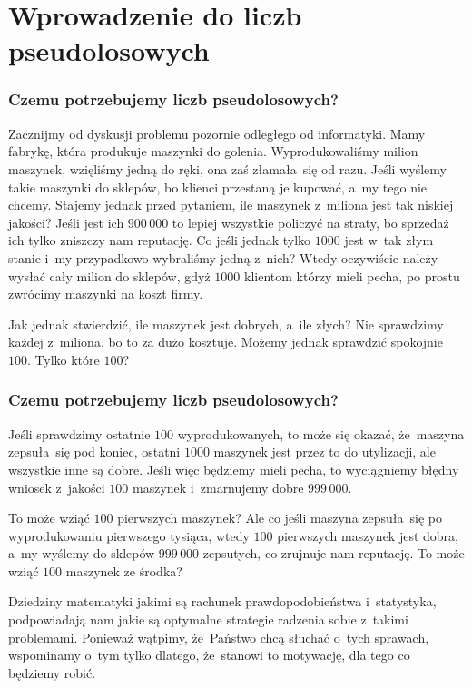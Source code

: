 \documentclass[10pt,t]{beamer}
\begin{document}
\section{Wprowadzenie do liczb pseudolosowych}


\begin{frame}
  \frametitle{Czemu potrzebujemy liczb pseudolosowych?}


  Zacznijmy od dyskusji problemu pozornie odległego od informatyki. Mamy
  fabrykę, która produkuje maszynki do golenia. Wyprodukowaliśmy milion
  maszynek, wzięliśmy jedną do ręki, ona zaś złamała~się od razu. Jeśli
  wyślemy takie maszynki do sklepów, bo klienci przestaną je kupować, a~my
  tego nie chcemy. Stajemy jednak przed pytaniem, ile maszynek z~miliona
  jest tak niskiej jakości? Jeśli jest ich $900 \, 000$ to lepiej wszystkie
  policzyć na straty, bo sprzedaż ich tylko zniszczy nam reputację. Co jeśli
  jednak tylko $1000$ jest w~tak złym stanie i~my przypadkowo wybraliśmy
  jedną z~nich? Wtedy oczywiście należy wysłać cały milion do sklepów, gdyż
  $1000$ klientom którzy mieli pecha, po prostu zwrócimy maszynki na koszt
  firmy.

  Jak jednak stwierdzić, ile maszynek jest dobrych, a~ile złych? Nie
  sprawdzimy każdej z~miliona, bo to za dużo kosztuje. Możemy jednak
  sprawdzić spokojnie $100$. Tylko które $100$?

\end{frame}





\begin{frame}
  \frametitle{Czemu potrzebujemy liczb pseudolosowych?}


  Jeśli sprawdzimy ostatnie $100$ wyprodukowanych, to może się okazać,
  że~maszyna zepsuła~się pod koniec, ostatni $1000$ maszynek jest przez to
  do utylizacji, ale wszystkie inne są dobre. Jeśli więc będziemy mieli
  pecha, to wyciągniemy błędny wniosek z~jakości $100$ maszynek i~zmarnujemy
  dobre $999 \, 000$.

  To może wziąć $100$ pierwszych maszynek? Ale co jeśli maszyna zepsuła~się
  po wyprodukowaniu pierwszego tysiąca, wtedy $100$ pierwszych maszynek
  jest dobra, a~my wyślemy do sklepów $999 \, 000$ zepsutych, co zrujnuje
  nam reputację. To może wziąć $100$ maszynek ze środka?

  Dziedziny matematyki jakimi są rachunek prawdopodobieństwa i~statystyka,
  podpowiadają nam jakie są optymalne strategie radzenia sobie z~takimi
  problemami. Ponieważ wątpimy, że~Państwo chcą słuchać o~tych sprawach,
  wspominamy o~tym tylko dlatego, że~stanowi to motywację, dla tego
  co będziemy robić.

\end{frame}
\end{document}

